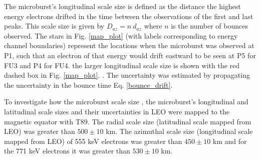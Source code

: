 \documentclass[draft, linenumbers]{agujournal}
\begin{document}

The microburst's longitudinal scale size is defined as the distance the highest energy electrons drifted in the time between the observations of the first and last peaks. This scale size is given by $D_{az} = n \ d_{az}$ where $n$ is the number of bounces observed. The stars in Fig. \ref{map_plot} (with labels corresponding to energy channel boundaries) represent the locations when the microburst was observed at P1, such that an electron of that energy would drift eastward to be seen at P5 for FU3 and P4 for FU4.  the larger longitudinal scale size  is shown with the red dashed box in Fig. \ref{map_plot}. . The uncertainty was estimated by propagating the uncertainty in the bounce time Eq. \ref{bounce_drift}. 

To investigate how the microburst scale size , the microburst's longitudinal and latitudinal scale sizes and their uncertainties in LEO were mapped to the magnetic equator with T89. The radial scale size (latitudinal scale mapped from LEO) was greater than $500 \pm​ 10$ km. The azimuthal scale size (longitudinal scale mapped from LEO) of 555 keV electrons was greater than $450 \pm 10$ km and for the 771 keV electrons it was greater than $530 \pm 10$ km. 
\end{document}
